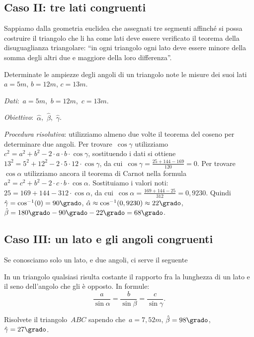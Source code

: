 \subsection{Caso II: tre lati congruenti}
Sappiamo dalla geometria euclidea che assegnati tre segmenti affinché si 
possa 
costruire il triangolo che li ha come lati
deve essere verificato il teorema della disuguaglianza triangolare: ``in ogni 
triangolo ogni lato deve essere minore della somma
degli altri due e maggiore della loro differenza''.

\begin{problema}
Determinate le ampiezze degli angoli di un triangolo note le misure dei suoi 
lati~$a=5\unit{m}$, $b=12\unit{m}$, $c=13\unit{m}$.
\end{problema}

\emph{Dati}:~$a= 5\unit{m}$,\quad~$b=12\unit{m}$,\quad~$c=13\unit{m}$.

\emph{Obiettivo}:~$\hat{\alpha}$,\quad~$\hat{\beta}$,\quad~$\hat{\gamma}$.

\emph{Procedura risolutiva}:
utilizziamo almeno due volte il teorema del coseno per determinare due 
angoli. 
Per trovare~$\cos \gamma$ utilizziamo
$c^{2}=a^{2}+b^{2}-2\cdot a\cdot b\cdot \cos \gamma$, sostituendo i dati si 
ottiene~$13^{2}=5^{2}+12^{2}-2\cdot 5\cdot 12\cdot \cos \gamma$,
da cui~$\cos \gamma=\frac{25+144-169}{120}=0$.
Per trovare~$\cos \alpha$ utilizziamo ancora il teorema di Carnot nella 
formula
$a^{2}=c^{2}+b^{2}-2\cdot c\cdot b\cdot \cos \alpha$. Sostituiamo i valori 
noti:~$25=169+144-312\cdot \cos \alpha$,
da cui~$\cos \alpha=\frac{169+144-25}{312}=0,9230$.
Quindi~$\hat{\gamma}=\cos^{-1}(0)=90\grado$, 
$\hat{\alpha}\approx\cos^{-1}(0,9230)\approx22\grado$, 
$\hat{\beta}=180\grado-90\grado-22\grado=68\grado$.

\subsection{Caso III: un lato e gli angoli congruenti}
Se conosciamo solo un lato, e due angoli, ci serve il seguente

\begin{teorema}
In un triangolo qualsiasi risulta costante il rapporto fra la lunghezza di un 
lato e il seno dell'angolo che gli è opposto. In formule:
\[\frac{a}{\sin \alpha}=\frac{b}{\sin \beta}=\frac{c}{\sin \gamma}.\]
\end{teorema}

\begin{problema}
Risolvete il triangolo~$ABC$ sapendo che~$a= 7,52\unit{m}$, 
$\hat{\beta}=98\grado$, ${\hat{\gamma}}=27\grado$.
\end{problema}

